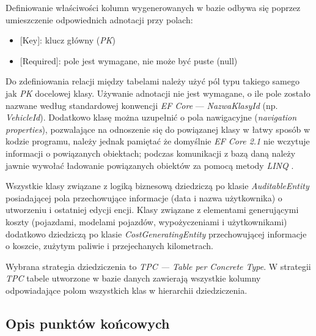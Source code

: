 \documentclass[eng,printmode,openany]{mgr}
\begin{document}
Definiowanie właściwości kolumn wygenerowanych w bazie odbywa się poprzez umieszczenie odpowiednich adnotacji przy polach:
\begin{itemize}
	\item $[$Key$]$: klucz główny (\textit{PK})
	\item $[$Required$]$: pole jest wymagane, nie może być puste (null)
\end{itemize}
Do zdefiniowania relacji między tabelami należy użyć pól typu takiego samego jak \textit{PK} docelowej klasy\cite{msdn-efcore-relationships}. Używanie adnotacji nie jest wymagane, o ile pole zostało nazwane według standardowej konwencji \textit{EF Core} — \textit{NazwaKlasyId} (np. \textit{VehicleId}). Dodatkowo klasę można uzupełnić o pola nawigacyjne (\textit{navigation properties}), pozwalające na odnoszenie się do powiązanej klasy w łatwy sposób w kodzie programu, należy jednak pamiętać że domyślnie \textit{EF Core 2.1} nie wczytuje informacji o powiązanych obiektach; podczas komunikacji z bazą daną należy jawnie wywołać ładowanie powiązanych obiektów za pomocą metody \textit{LINQ} .



\newpage 
Wszystkie klasy związane z logiką biznesową dziedziczą po klasie \textit{AuditableEntity} posiadającej pola przechowujące informacje (data i nazwa użytkownika) o utworzeniu i ostatniej edycji encji. Klasy związane z elementami generującymi koszty (pojazdami, modelami pojazdów, wypożyczeniami i użytkownikami) dodatkowo dziedziczą po klasie \textit{CostGeneratingEntity} przechowującej informacje o koszcie, zużytym paliwie i przejechanych kilometrach. 

Wybrana strategia dziedziczenia to \textit{TPC — Table per Concrete Type}. W strategii \textit{TPC} tabele utworzone w bazie danych zawierają wszystkie kolumny odpowiadające polom wszystkich klas w hierarchii dziedziczenia.





\subsection{Opis punktów końcowych}
\end{document}
